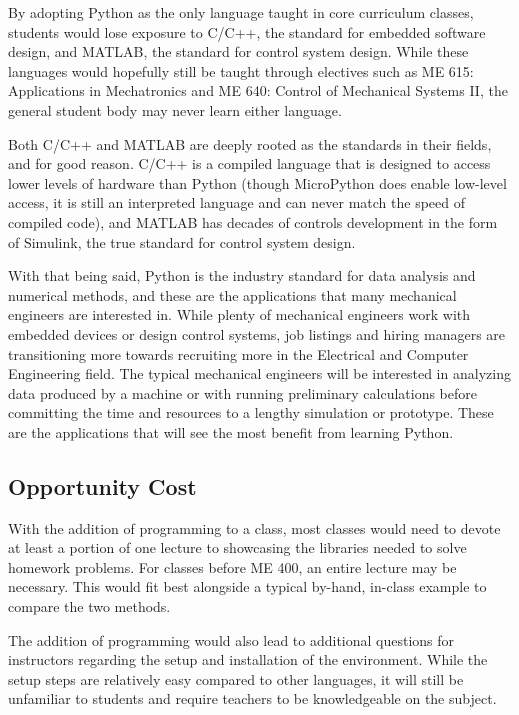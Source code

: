 By adopting Python as the only language taught in core curriculum
classes, students would lose exposure to C/C++, the standard for 
embedded software design, and MATLAB, the standard for control system
design. While these languages would hopefully still be taught
through electives such as ME 615: Applications in Mechatronics 
and ME 640: Control of Mechanical Systems II, the general student body
may never learn either language. 

Both C/C++ and MATLAB are deeply rooted as the standards in their fields,
and for good reason. C/C++ is a compiled language that is designed
to access lower levels of hardware than Python (though MicroPython does
enable low-level access, it is still an interpreted language and can
never match the speed of compiled code), and MATLAB has decades of controls
development in the form of Simulink, the true standard for control system 
design.

With that being said, Python is the industry standard for data analysis 
and numerical methods, and these are the applications that many mechanical
engineers are interested in. While plenty of mechanical engineers work 
with embedded devices or design control systems, job listings and hiring managers are
transitioning more towards recruiting more in the Electrical and Computer Engineering field.
The typical mechanical engineers will be interested in analyzing data produced 
by a machine or with running preliminary calculations before committing
the time and resources to a lengthy simulation or prototype. These are 
the applications that will see the most benefit from learning Python.

\subsection{Opportunity Cost}

With the addition of programming to a class, most classes would need to devote
at least a portion of one lecture to showcasing the libraries needed to 
solve homework problems. For classes before ME 400, an entire lecture may
be necessary. This would fit best alongside a typical by-hand, in-class
example to compare the two methods.

The addition of programming would also lead to additional questions for
instructors regarding the setup and installation of the environment. While
the setup steps are relatively easy compared to other languages, it will
still be unfamiliar to students and require teachers to be knowledgeable
on the subject.

